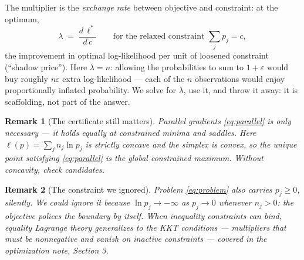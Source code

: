 \documentclass[11pt]{article}
\newtheorem{remark}{Remark}
\begin{document}
The multiplier is the \emph{exchange rate} between objective and
constraint: at the optimum,
\begin{equation}
  \lambda \;=\; \frac{d\,\ell^\ast}{d\,c}
  \qquad\text{for the relaxed constraint } \textstyle\sum_j p_j = c ,
  \label{eq:shadow}
\end{equation}
the improvement in optimal log-likelihood per unit of loosened
constraint (``shadow price''). Here $\lambda = n$: allowing the
probabilities to sum to $1+\varepsilon$ would buy roughly
$n\varepsilon$ extra log-likelihood --- each of the $n$ observations
would enjoy proportionally inflated probability. We solve for
$\lambda$, use it, and throw it away: it is scaffolding, not part of
the answer.

\begin{remark}[The certificate still matters]
Parallel gradients \eqref{eq:parallel} is only \emph{necessary} --- it
holds equally at constrained minima and saddles. Here
$\ell(p) = \sum_j n_j \ln p_j$ is strictly concave and the simplex is
convex, so the unique point satisfying \eqref{eq:parallel} is the
global constrained maximum. Without concavity, check candidates.
\end{remark}

\begin{remark}[The constraint we ignored]
Problem \eqref{eq:problem} also carries $p_j \ge 0$, silently. We could
ignore it because $\ln p_j \to -\infty$ as $p_j \to 0$ whenever
$n_j > 0$: the objective polices the boundary by itself. When
inequality constraints \emph{can} bind, equality Lagrange theory
generalizes to the KKT conditions --- multipliers that must be
nonnegative and vanish on inactive constraints --- covered in the
optimization note, Section 3.
\end{remark}
\end{document}
